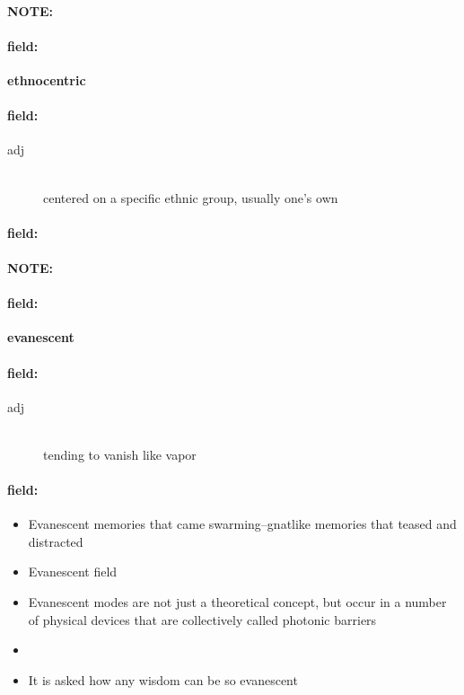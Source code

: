 \documentclass[12pt]{article}
\newenvironment{note}{\paragraph{NOTE:}}{}
\newenvironment{field}{\paragraph{field:}}{}
\begin{document}
\begin{note}
\begin{field}
\textbf{\large ethnocentric}
\end{field}


\begin{field}
\begin{description}
\item[adj] \hfill \\ 
centered on a specific ethnic group, usually one's own

\end{description}
\end{field}

\begin{field}
\end{field}
\end{note}
\begin{note}
\begin{field}
\textbf{\large evanescent}
\end{field}


\begin{field}
\begin{description}
\item[adj] \hfill \\ 
tending to vanish like vapor

\end{description}
\end{field}

\begin{field}
\begin{itemize}
\item Evanescent memories that came swarming--gnatlike memories that teased and distracted
\item Evanescent field
\item Evanescent modes are not just a theoretical concept, but occur in a number of physical devices that are collectively called photonic barriers
\item 
\item It is asked how any wisdom can be so evanescent
\end{itemize}
\end{field}
\end{note}
\end{document}
